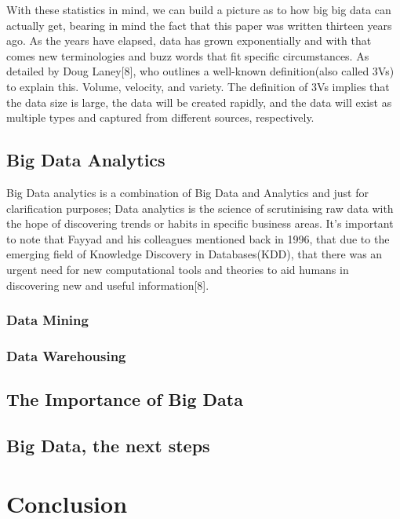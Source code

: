 \documentclass[10pt,journal,compsoc]{IEEEtran}
\begin{document}
With these statistics in mind, we can build a picture as to how big big data can actually get, bearing in mind the fact that this paper was written thirteen years ago. As the years have elapsed, data has grown exponentially and with that comes new terminologies and buzz words that fit specific circumstances. As detailed by Doug Laney[8], who outlines a well-known definition(also called 3Vs) to explain this. Volume, velocity, and variety. The definition of 3Vs implies that the data size is large, the data will be created rapidly, and the data will exist as multiple types and captured from different sources, respectively.

\subsection{Big Data Analytics}
Big Data analytics is a combination of Big Data and Analytics and just for clarification purposes; Data analytics is the science of scrutinising raw data with the hope of discovering trends or habits in specific business areas. It's important to note that Fayyad and his colleagues mentioned back in 1996, that due to the emerging field of Knowledge Discovery in Databases(KDD), that there was an urgent need for new computational tools and theories to aid humans in discovering new and useful information[8]. 

\subsubsection{Data Mining}

\subsubsection{Data Warehousing}

\subsection{The Importance of Big Data}

\subsection{Big Data, the next steps}

\section{Conclusion}
\end{document}
